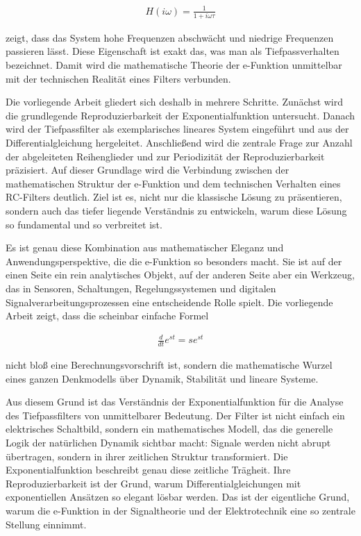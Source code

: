 \documentclass[a4paper, 12pt, twoside, openright]{report}
\theoremstyle{definition}
\theoremstyle{definition}
\begin{document}
\begin{align}
    H(i\omega) = \frac{1}{1+i\omega\tau}
\end{align}

zeigt, dass das System hohe Frequenzen abschwächt und niedrige Frequenzen passieren lässt. Diese Eigenschaft ist exakt das, was man als Tiefpassverhalten bezeichnet. Damit wird die mathematische Theorie der e-Funktion unmittelbar mit der technischen Realität eines Filters verbunden.

Die vorliegende Arbeit gliedert sich deshalb in mehrere Schritte. Zunächst wird die grundlegende Reproduzierbarkeit der Exponentialfunktion untersucht. Danach wird der Tiefpassfilter als exemplarisches lineares System eingeführt und aus der Differentialgleichung hergeleitet. Anschließend wird die zentrale Frage zur Anzahl der abgeleiteten Reihenglieder und zur Periodizität der Reproduzierbarkeit präzisiert. Auf dieser Grundlage wird die Verbindung zwischen der mathematischen Struktur der e-Funktion und dem technischen Verhalten eines RC-Filters deutlich. Ziel ist es, nicht nur die klassische Lösung zu präsentieren, sondern auch das tiefer liegende Verständnis zu entwickeln, warum diese Lösung so fundamental und so verbreitet ist.

Es ist genau diese Kombination aus mathematischer Eleganz und Anwendungsperspektive, die die e-Funktion so besonders macht. Sie ist auf der einen Seite ein rein analytisches Objekt, auf der anderen Seite aber ein Werkzeug, das in Sensoren, Schaltungen, Regelungssystemen und digitalen Signalverarbeitungsprozessen eine entscheidende Rolle spielt. Die vorliegende Arbeit zeigt, dass die scheinbar einfache Formel

\begin{align}
    \frac{d}{dt} e^{st} = s e^{st}
\end{align}

nicht bloß eine Berechnungsvorschrift ist, sondern die mathematische Wurzel eines ganzen Denkmodells über Dynamik, Stabilität und lineare Systeme.

Aus diesem Grund ist das Verständnis der Exponentialfunktion für die Analyse des Tiefpassfilters von unmittelbarer Bedeutung. Der Filter ist nicht einfach ein elektrisches Schaltbild, sondern ein mathematisches Modell, das die generelle Logik der natürlichen Dynamik sichtbar macht: Signale werden nicht abrupt übertragen, sondern in ihrer zeitlichen Struktur transformiert. Die Exponentialfunktion beschreibt genau diese zeitliche Trägheit. Ihre Reproduzierbarkeit ist der Grund, warum Differentialgleichungen mit exponentiellen Ansätzen so elegant lösbar werden. Das ist der eigentliche Grund, warum die e-Funktion in der Signaltheorie und der Elektrotechnik eine so zentrale Stellung einnimmt.
\end{document}
